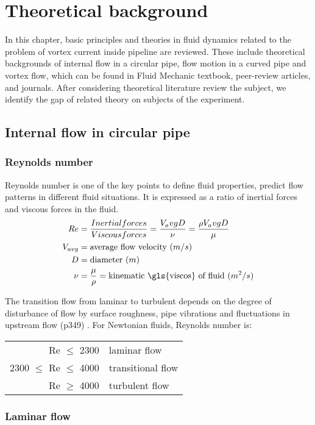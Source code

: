 
\chapter{Theoretical background}
In this chapter, basic principles and theories in fluid dynamics related to the problem of vortex current inside pipeline are reviewed. These include theoretical backgrounds of internal flow in a circular pipe, flow motion in a curved pipe and vortex flow, which can be found in Fluid Mechanic textbook, peer-review articles, and journals. After considering theoretical literature review the subject, we identify the gap of related theory on subjects of the experiment.

\section{Internal flow in circular pipe}

\subsection{Reynolds number}

Reynolds number is one of the key points to define fluid properties, predict flow patterns in different fluid situations. It is expressed as a ratio of inertial forces and viscous forces in the fluid. 
\begin{align}
Re & = \frac{Inertial forces}{Viscous forces} = \frac{V_avg D}{\nu} = \frac{\rho V_avg D}{\mu}  \\
V_{avg}  & = \tn{average flow velocity ($m/s$)} \\
D & = \tn{diameter ($m$)} \\
\nu & = \frac{\mu}{\rho} = \tn{kinematic \gls{viscos} of fluid ($m^2/s$)} 
\end{align}

The transition flow from laminar to turbulent depends on the degree of disturbance of flow by surface roughness, pipe vibrations and fluctuations in upstream flow (p349) \cite{cengel:book}. For Newtonian fluids, Reynolds number is:\begin{tabular}{r l}
Re $\leq$ 2300 & laminar flow \\
2300 $\leq$ Re $\leq$ 4000 & transitional flow \\
Re $\geq$ 4000 & turbulent flow
\end{tabular}

\subsection{Laminar flow}

